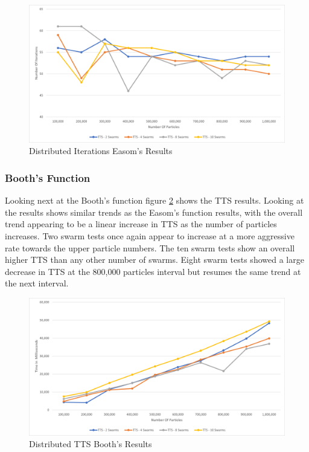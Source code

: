 \documentclass[oneside,12pt]{book}
\begin{document}
\begin{figure}[H]
    \centering
    \includegraphics[scale=0.45]{Images/Graphs/DistributedEasomEpoch.png}
    \caption{Distributed Iterations Easom's Results}
    \label{fig:Distributed_Epoc_Easom_Results}
\end{figure}

\subsubsection{Booth's Function}
Looking next at the Booth's function figure \ref{fig:Distributed_TTS_Booths_Results} shows the TTS results. Looking at the results shows similar trends as the Easom's function results, with the overall trend appearing to be a linear increase in TTS as the number of particles increases. Two swarm tests once again appear to increase at a more aggressive rate towards the upper particle numbers. The ten swarm tests show an overall higher TTS than any other number of swarms. Eight swarm tests showed a large decrease in TTS at the 800,000 particles interval but resumes the same trend at the next interval. 

\begin{figure}[H]
    \centering
    \includegraphics[scale=0.45]{Images/Graphs/DistributedBoothsTTS.png}
    \caption{Distributed TTS Booth's Results}
    \label{fig:Distributed_TTS_Booths_Results}
\end{figure}
\end{document}
